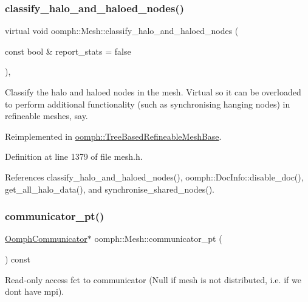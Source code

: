 \subsubsection{\texorpdfstring{classify\+\_\+halo\+\_\+and\+\_\+haloed\+\_\+nodes()}{classify\_halo\_and\_haloed\_nodes()}\hspace{0.1cm}{\footnotesize\ttfamily [2/2]}}
{\footnotesize\ttfamily virtual void oomph\+::\+Mesh\+::classify\+\_\+halo\+\_\+and\+\_\+haloed\+\_\+nodes (\begin{DoxyParamCaption}\item[{const bool \&}]{report\+\_\+stats = {\ttfamily false} }\end{DoxyParamCaption})\hspace{0.3cm}{\ttfamily [inline]}, {\ttfamily [virtual]}}

Classify the halo and haloed nodes in the mesh. Virtual so it can be overloaded to perform additional functionality (such as synchronising hanging nodes) in refineable meshes, say. 

Reimplemented in \hyperlink{classoomph_1_1TreeBasedRefineableMeshBase_a0f155de75a38d3356fb925629c3ae7ad}{oomph\+::\+Tree\+Based\+Refineable\+Mesh\+Base}.



Definition at line 1379 of file mesh.\+h.



References classify\+\_\+halo\+\_\+and\+\_\+haloed\+\_\+nodes(), oomph\+::\+Doc\+Info\+::disable\+\_\+doc(), get\+\_\+all\+\_\+halo\+\_\+data(), and synchronise\+\_\+shared\+\_\+nodes().

\mbox{\label{classoomph_1_1Mesh_a3b2c1aba0f9cb4e1767c65f9a3162577}} 
\subsubsection{\texorpdfstring{communicator\+\_\+pt()}{communicator\_pt()}}
{\footnotesize\ttfamily \hyperlink{classoomph_1_1OomphCommunicator}{Oomph\+Communicator}$\ast$ oomph\+::\+Mesh\+::communicator\+\_\+pt (\begin{DoxyParamCaption}{ }\end{DoxyParamCaption}) const\hspace{0.3cm}{\ttfamily [inline]}}

Read-\/only access fct to communicator (Null if mesh is not distributed, i.\+e. if we don\textquotesingle{}t have mpi). 

